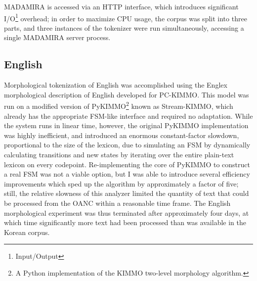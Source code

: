 MADAMIRA is accessed via an HTTP interface, which introduces significant I/O\footnote{Input/Output} overhead; in order to maximize CPU usage, the corpus was split into three parts, and three instances of the tokenizer were run simultaneously, accessing a single MADAMIRA server process.

\subsection{English}
Morphological tokenization of English was accomplished using the Englex morphological description of English\cite{antworthenglex} developed for PC-KIMMO\cite{koskenniemi84}. This model was run on a modified version of PyKIMMO\footnote{A Python implementation of the KIMMO two-level morphology algorithm.} known as Stream-KIMMO\cite{kearsley13}, which already has the appropriate FSM-like interface and required no adaptation. While the system runs in linear time, however, the original PyKIMMO implementation was highly inefficient, and introduced an enormous constant-factor slowdown, proportional to the size of the lexicon, due to simulating an FSM by dynamically calculating transitions and new states by iterating over the entire plain-text lexicon on every codepoint. Re-implementing the core of PyKIMMO to construct a real FSM was not a viable option, but I was able to introduce several efficiency improvements which sped up the algorithm by approximately a factor of five; still, the relative slowness of this analyzer limited the quantity of text that could be processed from the OANC within a reasonable time frame. The English morphological experiment was thus terminated after approximately four days, at which time significantly more text had been processed than was available in the Korean corpus.


